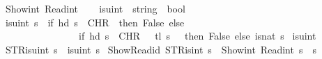 \begin{isabellebody}
\isamarkupfalse%
\ {\isachardoublequoteopen}Show\isactrlsub i\isactrlsub n\isactrlsub t\ {\isacharparenleft}{\kern0pt}Read\isactrlsub i\isactrlsub n\isactrlsub t\ {\isacharparenleft}{\kern0pt}{\isacharprime}{\kern0pt}{\isacharprime}{\kern0pt}{}{}{\isacharprime}{\kern0pt}{\isacharprime}{\kern0pt}{\isacharparenright}{\kern0pt}{\isacharparenright}{\kern0pt}\ {\isachardoublequoteclose}\isanewline
\isanewline
{}\isamarkupfalse%
\ \isanewline
is{\isacharunderscore}{\kern0pt}uint\ {\isacharcolon}{\kern0pt}{\isacharcolon}{\kern0pt}\ {\isacartoucheopen}string\ {\isasymRightarrow}\ bool{\isacartoucheclose}\ \isanewline
\ {\isacartoucheopen}is{\isacharunderscore}{\kern0pt}uint\ s\ {\isacharequal}{\kern0pt}\ {\isacharparenleft}{\kern0pt}if\ hd\ s\ {\isacharequal}{\kern0pt}\ {\isacharparenleft}{\kern0pt}CHR\ {\isacharprime}{\kern0pt}{\isacharprime}{\kern0pt}{\isacharminus}{\kern0pt}{\isacharprime}{\kern0pt}{\isacharprime}{\kern0pt}{\isacharparenright}{\kern0pt}\ then\ False\ else\ \isanewline
\ \ \ \ \ \ \ \ \ \ \ \ \ \ \ \ if\ hd\ s\ {\isacharequal}{\kern0pt}\ {\isacharparenleft}{\kern0pt}CHR\ {\isacharprime}{\kern0pt}{\isacharprime}{\kern0pt}{}{\isacharprime}{\kern0pt}{\isacharprime}{\kern0pt}{\isacharparenright}{\kern0pt}\ {\isasymand}\ tl\ s\ {\isasymnoteq}\ {\isacharbrackleft}{\kern0pt}{\isacharbrackright}{\kern0pt}\ then\ False\ else\ {\isacharparenleft}{\kern0pt}is{\isacharunderscore}{\kern0pt}nat\ s{\isacharparenright}{\kern0pt}{\isacharparenright}{\kern0pt}{\isacartoucheclose}\isanewline
\isanewline
{}\isamarkupfalse%
\ {\isachardoublequoteopen}is{\isacharunderscore}{\kern0pt}uint\ {\isacharprime}{\kern0pt}{\isacharprime}{\kern0pt}{}{}{\isacharprime}{\kern0pt}{\isacharprime}{\kern0pt}{\isachardoublequoteclose}\isanewline
\isanewline
{}\isamarkupfalse%
\ \isanewline
\ {\isacartoucheopen}STR{\isacharunderscore}{\kern0pt}is{\isacharunderscore}{\kern0pt}uint\ s\ {\isacharequal}{\kern0pt}\ is{\isacharunderscore}{\kern0pt}uint\ s{\isacartoucheclose}\isanewline
\isanewline
\isanewline
{}\isamarkupfalse%
\ Show{\isacharunderscore}{\kern0pt}Read{\isacharunderscore}{\kern0pt}id{\isacharcolon}{\kern0pt}\ {\isacartoucheopen}STR{\isacharunderscore}{\kern0pt}is{\isacharunderscore}{\kern0pt}int\ s\ {\isasymLongrightarrow}\ {\isacharparenleft}{\kern0pt}Show\isactrlsub i\isactrlsub n\isactrlsub t\ {\isacharparenleft}{\kern0pt}Read\isactrlsub i\isactrlsub n\isactrlsub t\ s{\isacharparenright}{\kern0pt}\ {\isacharequal}{\kern0pt}\ s{\isacharparenright}{\kern0pt}{\isacartoucheclose}\isanewline

\end{isabellebody}

